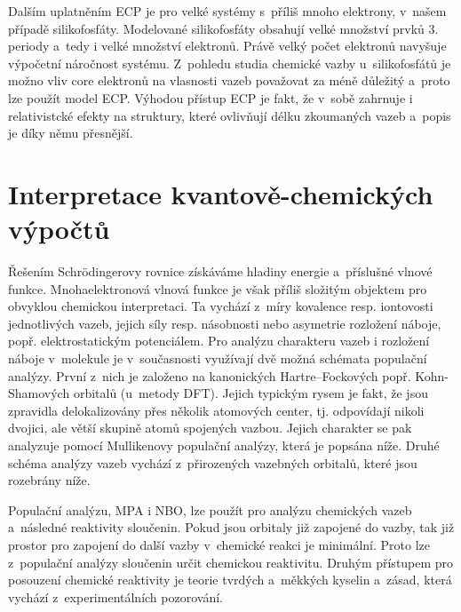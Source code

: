 \documentclass[
digital, %
table,   %
nolof,     %
nolot,     %
oneside,
]{fithesis3}
\begin{document}
Dalším uplatněním ECP je pro velké systémy s~příliš mnoho elektrony, v~našem případě silikofosfáty. Modelované silikofosfáty obsahují velké množství prvků 3. periody a~tedy i velké množství elektronů. Právě velký počet elektronů navyšuje výpočetní náročnost systému. Z~pohledu studia chemické vazby u~silikofosfátů je možno vliv core elektronů na vlasnosti vazeb považovat za méně důležitý a~proto lze použít model ECP. Výhodou přístup ECP je fakt, že v~sobě zahrnuje i relativistcké efekty na struktury, které ovlivňují délku zkoumaných vazeb a~popis je díky němu přesnější.

\section{Interpretace kvantově-chemických výpočtů}
Řešením Schrödingerovy rovnice získáváme hladiny energie a~příslušné vlnové funkce. Mnohaelektronová vlnová funkce je však příliš složitým objektem pro obvyklou chemickou interpretaci. Ta vychází z~míry kovalence resp. iontovosti jednotlivých vazeb, jejich síly resp. násobnosti nebo asymetrie rozložení náboje, popř. elektrostatickým potenciálem. Pro analýzu charakteru vazeb i rozložení náboje v~molekule je v~současnosti využívají dvě možná schémata populační analýzy. První z~nich je založeno na kanonických Hartre--Fockových popř. Kohn-Shamových orbitalů (u~metody DFT). Jejich typickým rysem je fakt, že jsou zpravidla delokalizovány přes několik atomových center, tj. odpovídají nikoli dvojici, ale větší skupině atomů spojených vazbou. Jejich charakter se pak analyzuje pomocí Mullikenovy populační analýzy, která je popsána níže. Druhé schéma analýzy vazeb vychází z~přirozených vazebných orbitalů, které jsou rozebrány níže.

Populační analýzu, MPA i NBO, lze použít pro analýzu chemických vazeb a~následné reaktivity sloučenin. Pokud jsou orbitaly již zapojené do vazby, tak již prostor pro zapojení do další vazby v~chemické reakci je minimální. Proto lze z~populační analýzy sloučenin určit chemickou reaktivitu. Druhým přístupem pro posouzení chemické reaktivity je teorie tvrdých a~měkkých kyselin a~zásad, která vychází z~experimentálních pozorování.
\end{document}

